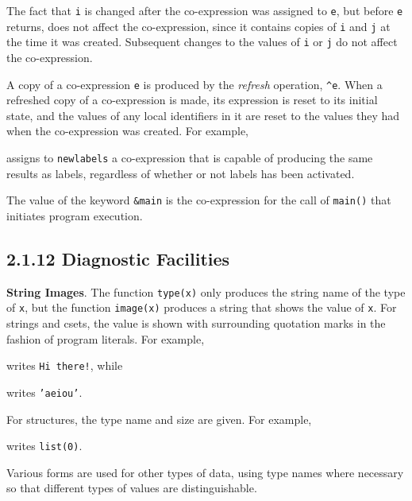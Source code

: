 The fact that \texttt{i} is changed after the co-expression was
assigned to \texttt{e}, but before \texttt{e} returns, does not affect
the co-expression, since it contains copies of \texttt{i} and
\texttt{j} at the time it was created.  Subsequent changes to the
values of \texttt{i} or \texttt{j} do not affect the co-expression.

A copy of a co-expression \texttt{e} is produced by the
\textit{refresh }operation, \texttt{\^{}e}. When a refreshed copy of a
co-expression is made, its expression is reset to its initial state,
and the values of any local identifiers in it are reset to the values
they had when the co-expression was created. For example,


\noindent assigns to \texttt{newlabels} a co-expression that is
capable of producing the same results as labels, regardless of whether
or not labels has been activated.

The value of the keyword \texttt{\&main} is the co-expression for the
call of \texttt{main()} that initiates program execution.


\subsection[2.1.12 Diagnostic Facilities]{2.1.12 Diagnostic Facilities}

\textbf{String Images}. The function \texttt{type(x)} only produces
the string name of the type of \texttt{x}, but the function
\texttt{image(x)} produces a string that shows the value of
\texttt{x}. For strings and csets, the value is shown with surrounding
quotation marks in the fashion of program literals. For example,


\noindent writes \texttt{{\textquotedbl}Hi there!{\textquotedbl}}, while


\noindent writes \texttt{{}'aeiou'}.

For structures, the type name and size are given. For example,


\noindent writes \texttt{list(0)}.

Various forms are used for other types of data, using type names where
necessary so that different types of values are distinguishable.


